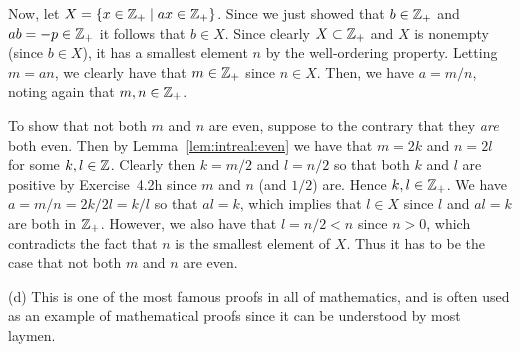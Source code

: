 {{    Now, let $X = \left\{ x \in {{\mathbb{Z}}_+} \mid a x \in {{\mathbb{Z}}_+} \right\}$.
    Since we just showed that $b \in {{\mathbb{Z}}_+}$ and $a b = -p \in {{\mathbb{Z}}_+}$ it follows that $b \in X$.
    Since clearly $X \subset {{\mathbb{Z}}_+}$ and $X$ is nonempty (since $b \in X$), it has a smallest element $n$ by the well-ordering property.
    Letting $m = an$, we clearly have that $m \in {{\mathbb{Z}}_+}$ since $n \in X$.
    Then, we have $a = m/n$, noting again that $m,n \in {{\mathbb{Z}}_+}$.

    To show that not both $m$ and $n$ are even, suppose to the contrary that they \emph{are} both even.
    Then by Lemma~\ref{lem:intreal:even} we have that $m = 2k$ and $n = 2l$ for some $k,l \in {\mathbb{Z}}$.
    Clearly then $k = m/2$ and $l = n/2$ so that both $k$ and $l$ are positive by Exercise~4.2h since $m$ and $n$ (and $1/2$) are.
    Hence $k,l \in {{\mathbb{Z}}_+}$.
    We have $a = m/n = 2k/2l = k/l$ so that $al = k$, which implies that $l \in X$ since $l$ and $al=k$ are both in ${{\mathbb{Z}}_+}$.
    However, we also have that $l = n/2 < n$ since $n > 0$, which contradicts the fact that $n$ is the smallest element of $X$.
    Thus it has to be the case that not both $m$ and $n$ are even.
  }

  (d) This is one of the most famous proofs in all of mathematics, and is often used as an example of mathematical proofs since it can be understood by most laymen.
}
